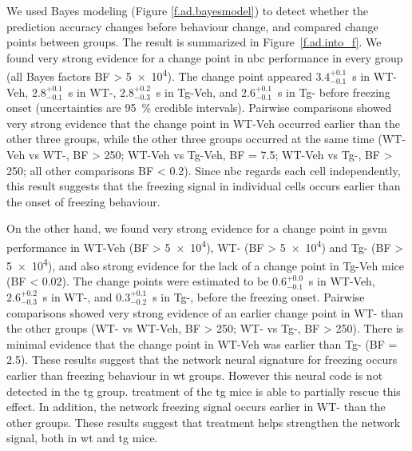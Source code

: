 We used Bayes modeling (Figure \ref{f.ad.bayesmodel}) to detect whether the prediction accuracy changes before behaviour change, and compared change points between groups. The result is summarized in Figure~\ref{f.ad.into_f}. We found very strong evidence for a change point in \gls{nbc} performance in every group (all Bayes factors BF > \num{5e4}). The change point appeared $3.4_{-0.1}^{+0.1}$\SI{}{\s} in WT-Veh, $2.8_{-0.1}^{+0.1}$\SI{}{\second} in WT-\glu, $2.8_{-0.3}^{+0.2}$\SI{}{\second} in Tg-Veh, and $2.6_{-0.1}^{+0.1}$\SI{}{\second} in Tg-\glu{} before freezing onset (uncertainties are \SI{95}{\percent} credible intervals). Pairwise comparisons showed very strong evidence that the change point in WT-Veh occurred earlier than the other three groups, while the other three groups occurred at the same time (WT-Veh vs WT-\glu, BF > \num{250}; WT-Veh vs Tg-Veh, BF = \num{7.5}; WT-Veh vs Tg-\glu, BF > \num{250}; all other comparisons BF < \num{0.2}). Since \gls{nbc} regards each cell independently, this result suggests that the freezing signal in individual cells occurs earlier than the onset of freezing behaviour.

On the other hand,  we found very strong evidence for a change point in \gls{gsvm} performance in WT-Veh (BF > \num{5e4}), WT-\glu{} (BF > \num{5e4}) and Tg-\glu{} (BF > \num{5e4}), and also strong evidence for the lack of a change point in Tg-Veh mice (BF < \num{0.02}). The change points were estimated to be $0.6_{-0.1}^{+0.0}$\SI{}{\s} in WT-Veh, $2.6_{-0.3}^{+0.2}$\SI{}{\second} in WT-\glu, and $0.3_{-0.2}^{+0.1}$\SI{}{\s} in Tg-\glu, before the freezing onset. Pairwise comparisons showed very strong evidence of an earlier change point in WT-\glu{} than the other groups (WT-\glu{} vs WT-Veh, BF > \num{250}; WT-\glu{} vs Tg-\glu, BF > \num{250}). There is minimal evidence that the change point in WT-Veh was earlier than Tg-\glu{} (BF = \num{2.5}). These results suggest that the network neural signature for freezing occurs earlier than freezing behaviour in \gls{wt} groups. However this neural code is not detected in the \gls{tg} group. \tglu{} treatment of the \gls{tg} mice is able to partially rescue this effect. In addition, the network freezing signal occurs earlier in WT-\glu{} than the other groups. These results suggest that \tglu{} treatment helps strengthen the network signal, both in \gls{wt} and \gls{tg} mice. 


